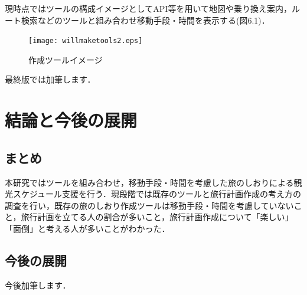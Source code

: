 \documentclass{funthesis}
\begin{document}
現時点ではツールの構成イメージとしてAPI等を用いて地図や乗り換え案内，ルート検索などのツールと組み合わせ移動手段・時間を表示する(図6.1)．
\begin{figure}[htpb]
\begin{center}
\texttt{[image: willmaketools2.eps]}
\caption{作成ツールイメージ}
\end{center}
\end{figure}

最終版では加筆します．

\chapter{結論と今後の展開}%

\section{まとめ}

本研究ではツールを組み合わせ，移動手段・時間を考慮した旅のしおりによる観光スケジュール支援を行う．現段階では既存のツールと旅行計画作成の考え方の調査を行い，既存の旅のしおり作成ツールは移動手段・時間を考慮していないこと，旅行計画を立てる人の割合が多いこと，旅行計画作成について「楽しい」「面倒」と考える人が多いことがわかった．\\



\section{今後の展開}
今後加筆します．



\end{document}
